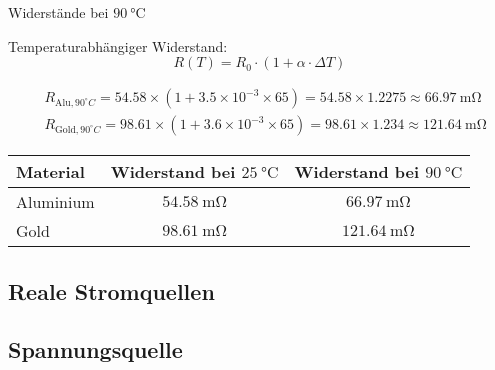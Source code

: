 {Widerstände bei \(\SI{90}{\celsius}\)

Temperaturabhängiger Widerstand:
\[
R(T) = R_0 \cdot \left( 1 + \alpha \cdot \Delta T \right)
\]

\begin{align*}
&R_{\text{Alu},90^\circ C} = 54.58 \times (1 + 3.5 \times 10^{-3} \times 65) = 54.58 \times 1.2275 \approx \SI{66.97}{\milli\ohm} \\
&R_{\text{Gold},90^\circ C} = 98.61 \times (1 + 3.6 \times 10^{-3} \times 65) = 98.61 \times 1.234 \approx \SI{121.64}{\milli\ohm}
\end{align*}


\begin{tabular}{lcc}
\toprule
Material & Widerstand bei \(\SI{25}{\celsius}\) & Widerstand bei \(\SI{90}{\celsius}\) \\
\midrule
Aluminium & \(\SI{54.58}{\milli\ohm}\) & \(\SI{66.97}{\milli\ohm}\) \\
Gold & \(\SI{98.61}{\milli\ohm}\) & \(\SI{121.64}{\milli\ohm}\) \\
\bottomrule
\end{tabular}




}

\subsection{Reale Stromquellen\label{Reale Stromquellen}}


\subsection{Spannungsquelle\label{Spannungsquelle}}
\Loesung{
\[
R_\text{ges} = R_1 + R_2 = 2 + 4 = \SI{6}{\ohm}, \quad
I = \frac{U}{R_\text{ges}} = \frac{10}{6} = \SI{1.67}{\ampere}
\]

\[
U_{R_1} = I \cdot R_1 = 1.67 \cdot 2 = \SI{3.33}{\volt}, \quad
U_{R_2} = U - U_{R_1} = \SI{6.67}{\volt}
\]

\[
I_{R_2} = \frac{U_{R_2}}{R_2} = \frac{6.67}{4} = \SI{1.67}{\ampere}
\]
}

